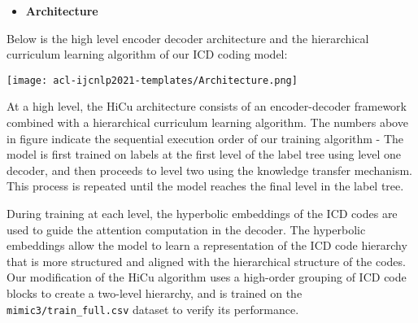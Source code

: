 \documentclass[11pt,a4paper]{article}
\begin{document}
\begin{itemize}
\item \textbf{Architecture} 
\end{itemize}
Below is the high level encoder decoder architecture and the hierarchical curriculum learning algorithm of our ICD coding model:
\begin{flushleft}\texttt{[image: acl-ijcnlp2021-templates/Architecture.png]}\end{flushleft}

 At a high level, the HiCu architecture consists of an encoder-decoder framework combined with a hierarchical curriculum learning algorithm. The numbers above in figure indicate the sequential execution order of our training algorithm - The model is first trained on labels at the first level of the label tree using level one decoder, and then proceeds to level two using the knowledge transfer mechanism. This process is repeated until the model reaches the final level in the label tree. 

During training at each level, the hyperbolic embeddings of the ICD codes are used to guide the attention computation in the decoder. The hyperbolic embeddings allow the model to learn a representation of the ICD code hierarchy that is more structured and aligned with the hierarchical structure of the codes. Our modification of the HiCu
algorithm uses a high-order grouping of ICD code blocks to create a two-level hierarchy, and is trained on the \texttt{mimic3/train\_full.csv} dataset to verify its performance.
\end{document}
